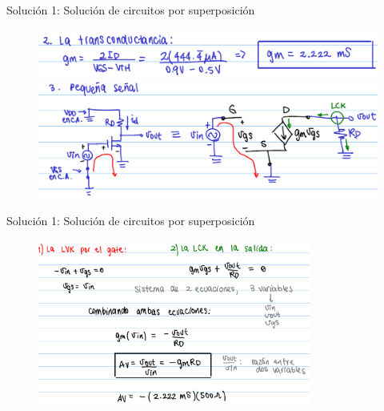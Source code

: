 \documentclass[t,aspectratio=169]{beamer}
\begin{document}
\begin{frame}{Solución 1: Solución de circuitos por superposición}

\begin{figure}[H]
    \centering
    \includegraphics[width=\textwidth]{figuras/ejemplo_1_4.png}

    \includegraphics[width=\textwidth]{figuras/ejemplo_1_5.png}
\end{figure}

\end{frame}


\begin{frame}{Solución 1: Solución de circuitos por superposición}

\begin{figure}[H]
    \centering
    \includegraphics[width=0.8\textwidth]{figuras/ejemplo_1_6.png}
\end{figure}

\end{frame}
\end{document}
